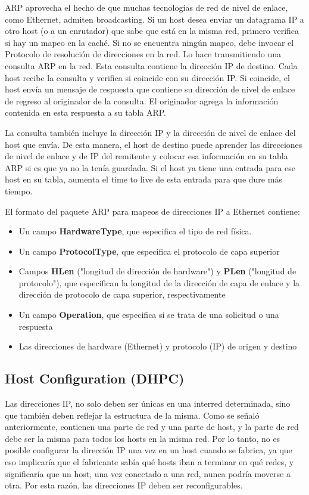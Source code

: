 ARP aprovecha el hecho de que muchas tecnologías de red de nivel de enlace, como Ethernet, admiten broadcasting. Si un host desea enviar un datagrama IP a otro host (o a un enrutador) que sabe que está en la misma red, primero verifica si hay un mapeo en la caché. Si no se encuentra ningún mapeo, debe invocar el Protocolo de resolución de direcciones en la red. Lo hace transmitiendo una consulta ARP en la red. Esta consulta contiene la dirección IP de destino. Cada host recibe la consulta y verifica si coincide con su dirección IP. Si coincide, el host envía un mensaje de respuesta que contiene su dirección de nivel de enlace de regreso al originador de la consulta. El originador agrega la información contenida en esta respuesta a su tabla ARP.

La consulta también incluye la dirección IP y la dirección de nivel de enlace del host que envía. De esta manera, el host de destino puede aprender las direcciones de nivel de enlace y de IP del remitente y colocar esa información en su tabla ARP si es que ya no la tenía guardada.  Si el host ya tiene una entrada para ese host en su tabla, aumenta el time to live de esta entrada para que dure más tiempo.

El formato del paquete ARP para mapeos de direcciones IP a Ethernet contiene:
\begin{itemize}
    \item Un campo \textbf{HardwareType}, que especifica el tipo de red física.
    \item Un campo \textbf{ProtocolType}, que especifica el protocolo de capa superior
    \item Campos \textbf{HLen} ("longitud de dirección de hardware") y \textbf{PLen} ("longitud de protocolo"), que especifican la longitud de la dirección de capa de enlace y la dirección de protocolo de capa superior, respectivamente
    \item Un campo \textbf{Operation}, que especifica si se trata de una solicitud o una respuesta
    \item Las direcciones de hardware (Ethernet) y protocolo (IP) de origen y destino
\end{itemize}

\subsection{Host Configuration (DHPC)}
Las direcciones IP, no solo deben ser únicas en una interred determinada, sino que también deben reflejar la estructura de la misma. Como se señaló anteriormente, contienen una parte de red y una parte de host, y la parte de red debe ser la misma para todos los hosts en la misma red. Por lo tanto, no es posible configurar la dirección IP una vez en un host cuando se fabrica, ya que eso implicaría que el fabricante sabía qué hosts iban a terminar en qué redes, y significaría que un host, una vez conectado a una red, nunca podría moverse a otra. Por esta razón, las direcciones IP deben ser reconfigurables.


